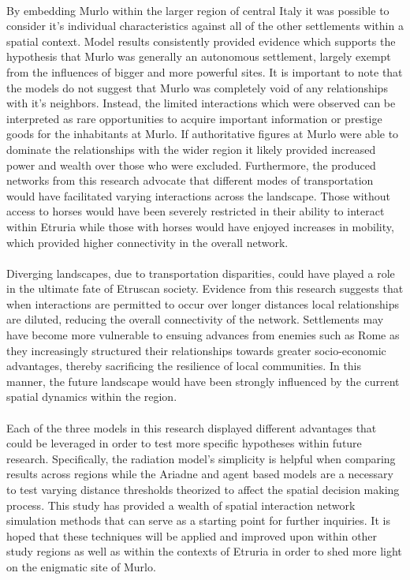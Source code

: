\documentclass[12pt,a4paper]{thesis}
\begin{document}
\paragraph{} 
By embedding Murlo within the larger region of central Italy it was possible to consider it's individual characteristics against all of the other settlements within a spatial context. Model results consistently provided evidence which supports the hypothesis that Murlo was generally an autonomous settlement, largely exempt from the influences of bigger and more powerful sites. It is important to note that the models do not suggest that Murlo was completely void of any relationships with it's neighbors. Instead, the limited interactions which were observed can be interpreted as rare opportunities to acquire important information or prestige goods for the inhabitants at Murlo. If authoritative figures at Murlo were able to dominate the relationships with the wider region it likely provided increased power and wealth over those who were excluded. Furthermore, the produced networks from this research advocate that different modes of transportation would have facilitated varying interactions across the landscape. Those without access to horses would have been severely restricted in their ability to interact within Etruria while those with horses would have enjoyed increases in mobility, which provided higher connectivity in the overall network.         

 
\paragraph{}
Diverging landscapes, due to transportation disparities, could have played a role in the ultimate fate of Etruscan society. Evidence from this research suggests that when interactions are permitted to occur over longer distances local relationships are diluted, reducing the overall connectivity of the network. Settlements may have become more vulnerable to ensuing advances from enemies such as Rome as they increasingly structured their relationships towards greater socio-economic advantages, thereby sacrificing the resilience of local communities. In this manner, the future landscape would have been strongly influenced by the current spatial dynamics within the region.    


\paragraph{}
Each of the three models in this research displayed different advantages that could be leveraged in order to test more specific hypotheses within future research. Specifically, the radiation model's simplicity is helpful when comparing results across regions while the Ariadne and agent based models are a necessary to test varying distance thresholds theorized to affect the spatial decision making process. This study has provided a wealth of spatial interaction network simulation methods that can serve as a starting point for further inquiries. It is hoped that these techniques will be applied and improved upon within other study regions as well as within the contexts of Etruria in order to shed more light on the enigmatic site of Murlo. 
\end{document}
